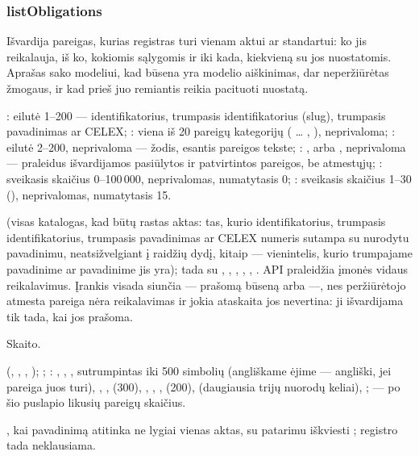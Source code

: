 \subsubsection{listObligations}\label{sec:tools:listObligations}
\begin{description}[style=multiline, leftmargin=19mm, labelwidth=17mm, labelsep=2mm,
  font=\sffamily\bfseries\footnotesize\color{ink}, itemsep=1pt, topsep=2pt, before=\raggedright]
  \item[Paskirtis] Išvardija pareigas, kurias registras turi vienam aktui ar standartui: ko jis
    reikalauja, iš ko, kokiomis sąlygomis ir iki kada, kiekvieną su jos nuostatomis. Aprašas
    sako modeliui, kad būsena  yra modelio aiškinimas, dar neperžiūrėtas
    žmogaus, ir kad prieš juo remiantis reikia pacituoti nuostatą.
  \item[Įvestis] : eilutė 1--200 --- identifikatorius, trumpasis identifikatorius
    (slug), trumpasis pavadinimas ar CELEX; : viena iš 20 pareigų kategorijų
    ( … , ), neprivaloma; : eilutė
    2--200, neprivaloma --- žodis, esantis pareigos tekste; : ,
     arba , neprivaloma --- praleidus išvardijamos pasiūlytos ir
    patvirtintos pareigos, be atmestųjų; : sveikasis skaičius
    0--100\,000, neprivalomas, numatytasis 0; : sveikasis skaičius 1--30
    (), neprivalomas, numatytasis 15.
  \item[Užklausos]  (visas katalogas, kad būtų rastas aktas:
    tas, kurio identifikatorius, trumpasis identifikatorius, trumpasis pavadinimas ar CELEX
    numeris sutampa su nurodytu pavadinimu, neatsižvelgiant į raidžių dydį, kitaip ---
    vienintelis, kurio trumpajame pavadinime ar pavadinime jis yra); tada
     su , , ,
    , , . API praleidžia įmonės vidaus reikalavimus.
    Įrankis visada siunčia  --- prašomą būseną arba  ---,
    nes peržiūrėtojo atmesta pareiga nėra reikalavimas ir jokia ataskaita jos nevertina: ji
    išvardijama tik tada, kai jos prašoma.
  \item[Pobūdis] Skaito.
  \item[Grąžina]  (, , , );
    ; : , , , sutrumpintas iki
    500 simbolių (angliškame ėjime --- angliški, jei pareiga juos turi), ,
    ,  (300), , ,
    ,  (200),  (daugiausia trijų nuorodų
    keliai), ;  --- po šio puslapio likusių pareigų skaičius.
  \item[Klaidos] , kai pavadinimą atitinka ne lygiai vienas aktas, su
    patarimu iškviesti ; registro tada neklausiama.
\end{description}


